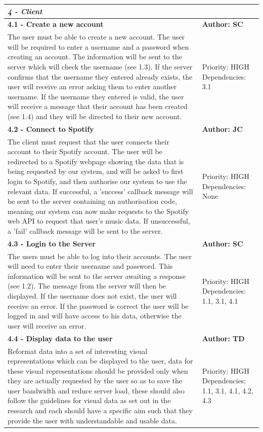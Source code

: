 \documentclass[11pt]{report}
\begin{document}
\begin{center}
\begin{longtable}{| p{13cm} | p{3cm} |}
\multicolumn{2}{|l|}{\textbf{\textit{4 - Client}}} \\
\hline
\textbf{4.1 - Create a new account} & \textbf{Author: SC} \\
\hline
The user must be able to create a new account. The user will be required to enter a username and a password when creating an account. The information will be sent to the server which will check the username (see 1.3). If the server confirms that the username they entered already exists, the user will receive an error asking them to enter another username. If the username they entered is valid, the user will receive a message that their account has been created (see 1.4) and they will be directed to their new account. & Priority: HIGH Dependencies: 3.1 \\
\hline
\textbf{4.2 - Connect to Spotify} & \textbf{Author: JC} \\
\hline
The client must request that the user connects their account to their Spotify account. The user will be redirected to a Spotify webpage showing the data that is being requested by our system, and will be asked to first login to Spotify, and then authorise our system to use the relevant data. If successful, a 'success' callback message will be sent to the server containing an authorisation code, meaning our system can now make requests to the Spotify web API to request that user's music data. If unsuccessful, a 'fail' callback message will be sent to the server.& Priority: HIGH Dependencies: None \\
\hline
\textbf{4.3 - Login to the Server} & \textbf{Author: SC} \\
\hline
The users must be able to log into their accounts. The user will need to enter their username and password. This information will be sent to the server awaiting a response (see 1.2). The message from the server will then be displayed. If the username does not exist, the user will receive an error. If the password is correct the user will be logged in and will have access to his data, otherwise the user will receive an error. &  Priority: HIGH Dependencies: 1.1, 3.1, 4.1 \\
\hline
\textbf{4.4 - Display data to the user} & \textbf{Author: TD} \\
\hline
Reformat data into a set of interesting visual representations which can be displayed to the user, data for these visual representations should be provided only when they are actually requested by the user so as to save the user bandwidth and reduce server load, these should also follow the guidelines for visual data as set out in the research and each should have a specific aim such that they provide the user with understandable and usable data. &  Priority: HIGH Dependencies: 1.1, 3.1, 4.1, 4.2, 4.3 \\

\end{longtable}
\end{center}
\end{document}
